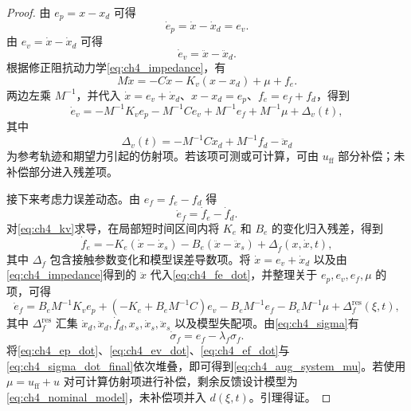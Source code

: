 \begin{proof}
由 $e_p=x-x_d$ 可得
\begin{equation}
  \dot e_p=\dot x-
  \dot x_d=e_v .
  \label{eq:ch4_ep_dot}
\end{equation}
由 $e_v=\dot x-\dot x_d$ 可得
\begin{equation}
  \dot e_v=\ddot x-\ddot x_d .
  \label{eq:ch4_ev_dot_def}
\end{equation}
根据修正阻抗动力学\eqref{eq:ch4_impedance}，有
\begin{equation}
  M\ddot x=-C\dot x-K_v(x-x_d)+\mu+f_e .
\end{equation}
两边左乘 $M^{-1}$，并代入 $\dot x=e_v+\dot x_d$、$x-x_d=e_p$、$f_e=e_f+f_d$，得到
\begin{equation}
  \dot e_v=-M^{-1}K_ve_p-M^{-1}Ce_v+M^{-1}e_f+M^{-1}\mu+\Delta_v(t),
  \label{eq:ch4_ev_dot}
\end{equation}
其中
\begin{equation}
  \Delta_v(t)=-M^{-1}C\dot x_d+M^{-1}f_d-\ddot x_d
  \label{eq:ch4_delta_v}
\end{equation}
为参考轨迹和期望力引起的仿射项。若该项可测或可计算，可由 $u_{\mathrm{ff}}$ 部分补偿；未补偿部分进入残差项。

接下来考虑力误差动态。由 $e_f=f_e-f_d$ 得
\begin{equation}
  \dot e_f=\dot f_e-\dot f_d .
  \label{eq:ch4_ef_dot_def}
\end{equation}
对\eqref{eq:ch4_kv}求导，在局部短时间区间内将 $K_e$ 和 $B_e$ 的变化归入残差，得到
\begin{equation}
  \dot f_e=-K_e(\dot x-\dot x_s)-B_e(\ddot x-\ddot x_s)+\Delta_{\dot f}(x,\dot x,t),
  \label{eq:ch4_fe_dot}
\end{equation}
其中 $\Delta_{\dot f}$ 包含接触参数变化和模型误差导数项。将 $\dot x=e_v+\dot x_d$ 以及由\eqref{eq:ch4_impedance}得到的 $\ddot x$ 代入\eqref{eq:ch4_fe_dot}，并整理关于 $e_p,e_v,e_f,\mu$ 的项，可得
\begin{equation}
  \dot e_f=B_eM^{-1}K_ve_p+(-K_e+B_eM^{-1}C)e_v-B_eM^{-1}e_f-B_eM^{-1}\mu+\Delta_f^{\mathrm{res}}(\xi,t),
  \label{eq:ch4_ef_dot}
\end{equation}
其中 $\Delta_f^{\mathrm{res}}$ 汇集 $\dot x_d,\ddot x_d,\dot f_d,x_s,\dot x_s,\ddot x_s$ 以及模型失配项。由\eqref{eq:ch4_sigma}有
\begin{equation}
  \dot\sigma_f=e_f-\lambda_f\sigma_f .
  \label{eq:ch4_sigma_dot_final}
\end{equation}
将\eqref{eq:ch4_ep_dot}、\eqref{eq:ch4_ev_dot}、\eqref{eq:ch4_ef_dot}与\eqref{eq:ch4_sigma_dot_final}依次堆叠，即可得到\eqref{eq:ch4_aug_system_mu}。若使用 $\mu=u_{\mathrm{ff}}+u$ 对可计算仿射项进行补偿，剩余反馈设计模型为\eqref{eq:ch4_nominal_model}，未补偿项并入 $d(\xi,t)$。引理得证。
\end{proof}


